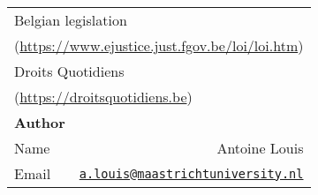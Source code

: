 \documentclass[11pt]{article}
\begin{document}
\begin{table*}[t]
\begin{subtable}[t]{.55\linewidth}
\begin{tabular}{|lr|}
        \multicolumn{2}{|l|}{Belgian legislation}                                                                                   \\
        \multicolumn{2}{|l|}{\scriptsize\hspace{0.5cm}(\url{https://www.ejustice.just.fgov.be/loi/loi.htm})}                        \\
        \multicolumn{2}{|l|}{Droits Quotidiens}                                                                                     \\
        \multicolumn{2}{|l|}{\scriptsize\hspace{0.5cm}(\url{https://droitsquotidiens.be})}                                      \\ \hline
        \textbf{Author}      &                                                                                                      \\
        Name                 & Antoine Louis                                                                                 \\
        Email                & \href{mailto:}{\texttt{\scriptsize a.louis@maastrichtuniversity.nl}}  \\ \hline
    \end{tabular}
\end{subtable}
\end{table*}
\end{document}
